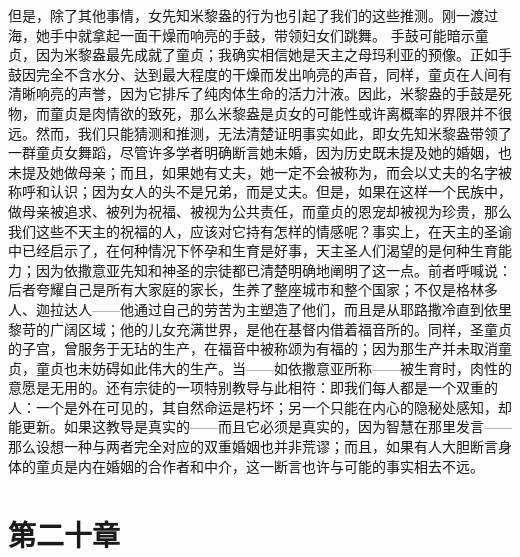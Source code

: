 但是，除了其他事情，女先知米黎盎的行为也引起了我们的这些推测。刚一渡过海，她手中就拿起一面干燥而响亮的手鼓，带领妇女们跳舞。 手鼓可能暗示童贞，因为米黎盎最先成就了童贞；我确实相信她是天主之母玛利亚的预像。正如手鼓因完全不含水分、达到最大程度的干燥而发出响亮的声音，同样，童贞在人间有清晰响亮的声誉，因为它排斥了纯肉体生命的活力汁液。因此，米黎盎的手鼓是死物，而童贞是肉情欲的致死，那么米黎盎是贞女的可能性或许离概率的界限并不很远。然而，我们只能猜测和推测，无法清楚证明事实如此，即女先知米黎盎带领了一群童贞女舞蹈，尽管许多学者明确断言她未婚，因为历史既未提及她的婚姻，也未提及她做母亲；而且，如果她有丈夫，她一定不会被称为，而会以丈夫的名字被称呼和认识；因为女人的头不是兄弟，而是丈夫。但是，如果在这样一个民族中，做母亲被追求、被列为祝福、被视为公共责任，而童贞的恩宠却被视为珍贵，那么我们这些不天主的祝福的人，应该对它持有怎样的情感呢？事实上，在天主的圣谕中已经启示了，在何种情况下怀孕和生育是好事，天主圣人们渴望的是何种生育能力；因为依撒意亚先知和神圣的宗徒都已清楚明确地阐明了这一点。前者呼喊说：后者夸耀自己是所有大家庭的家长，生养了整座城市和整个国家；不仅是格林多人、迦拉达人——他通过自己的劳苦为主塑造了他们，而且是从耶路撒冷直到依里黎苛的广阔区域；他的儿女充满世界，是他在基督内借着福音所的。同样，圣童贞的子宫，曾服务于无玷的生产，在福音中被称颂为有福的；因为那生产并未取消童贞，童贞也未妨碍如此伟大的生产。当——如依撒意亚所称——被生育时，肉性的意愿是无用的。还有宗徒的一项特别教导与此相符：即我们每人都是一个双重的人：一个是外在可见的，其自然命运是朽坏；另一个只能在内心的隐秘处感知，却能更新。如果这教导是真实的——而且它必须是真实的，因为智慧在那里发言——那么设想一种与两者完全对应的双重婚姻也并非荒谬；而且，如果有人大胆断言身体的童贞是内在婚姻的合作者和中介，这一断言也许与可能的事实相去不远。\par


\section{第二十章}

